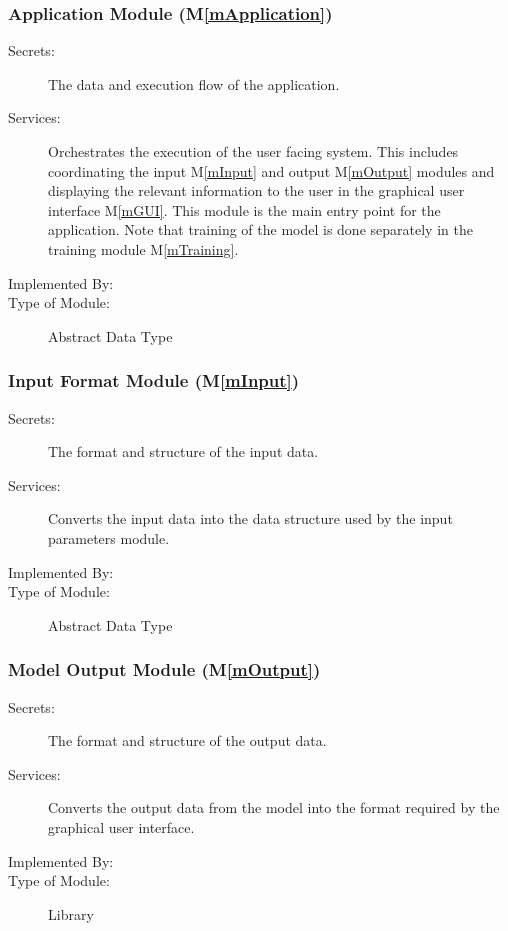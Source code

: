 \documentclass[12pt, titlepage]{article}
\newcommand{\mref}[1]{M\ref{#1}}
\begin{document}
\subsubsection{Application Module (\mref{mApplication})}

\begin{description}
\item[Secrets:] The data and execution flow of the application.
\item[Services:] Orchestrates the execution of the user facing system.
This includes coordinating the input \mref{mInput} and output \mref{mOutput}
modules and displaying the relevant information to the user in the graphical
user interface \mref{mGUI}. This module is the main entry point for the
application. Note that training of the model is done separately in the training
module \mref{mTraining}.
\item[Implemented By:] \progname{}
\item[Type of Module:] Abstract Data Type
\end{description}

\subsubsection{Input Format Module (\mref{mInput})}

\begin{description}
\item[Secrets:]The format and structure of the input data.
\item[Services:]Converts the input data into the data structure used by the
  input parameters module.
\item[Implemented By:] \progname{}
\item[Type of Module:] Abstract Data Type
\end{description}

\subsubsection{Model Output Module (\mref{mOutput})}

\begin{description}
\item[Secrets:] The format and structure of the output data.
\item[Services:] Converts the output data from the model into the format
required by the graphical user interface.
\item[Implemented By:] \progname{}
\item[Type of Module:] Library
\end{description}
\end{document}
